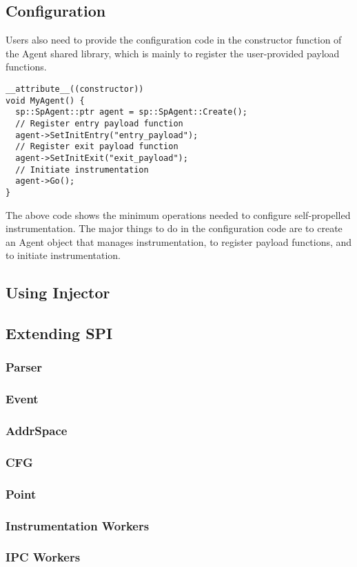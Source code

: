 \subsection{Configuration}
Users also need to provide the configuration code in the constructor function of
the Agent shared library, which is mainly to register the user-provided payload
functions.
\lstset{numbers=left}
\begin{lstlisting}[caption=Configuration code]
__attribute__((constructor))
void MyAgent() {
  sp::SpAgent::ptr agent = sp::SpAgent::Create();
  // Register entry payload function
  agent->SetInitEntry("entry_payload");
  // Register exit payload function
  agent->SetInitExit("exit_payload");
  // Initiate instrumentation
  agent->Go();
}
\end{lstlisting}
The above code shows the minimum operations needed to configure self-propelled
instrumentation.
The major things to do in the configuration code are to create an Agent object
that manages instrumentation, to register payload functions, and to initiate
instrumentation.

\subsection{Using Injector}

\subsection{Extending SPI}
\subsubsection{Parser}
\subsubsection{Event}
\subsubsection{AddrSpace}
\subsubsection{CFG}
\subsubsection{Point}
\subsubsection{Instrumentation Workers}
\subsubsection{IPC Workers}

